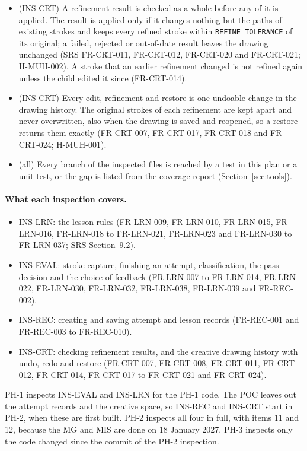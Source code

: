 \documentclass[12pt, titlepage]{article}
\begin{document}
\begin{itemize}
\item[A9] (INS-CRT) A refinement result is checked as a whole before any
of it is applied. The result is applied only if it changes nothing but the paths
of existing strokes and keeps every refined stroke within
\texttt{REFINE\_TOLERANCE} of its original; a failed, rejected or
out-of-date result leaves the drawing unchanged (SRS FR-CRT-011,
FR-CRT-012, FR-CRT-020 and FR-CRT-021; H-MUH-002). A stroke that an earlier
refinement changed is not refined again unless the child edited it since
(FR-CRT-014).
\item[A10] (INS-CRT) Every edit, refinement and restore is one undoable
change in the drawing history. The original strokes of each refinement
are kept apart and never overwritten, also when the drawing is saved and
reopened, so a restore returns them exactly (FR-CRT-007, FR-CRT-017,
FR-CRT-018 and FR-CRT-024; H-MUH-001).
\item[A11] (all) Every branch of the inspected files is reached by a test in
this plan or a unit test, or the gap is listed from the coverage report
(Section~\ref{sec:tools}).
\end{itemize}

\paragraph{What each inspection covers.}
\begin{itemize}
\item INS-LRN: the lesson rules (FR-LRN-009, FR-LRN-010, FR-LRN-015,
FR-LRN-016, FR-LRN-018 to FR-LRN-021, FR-LRN-023 and FR-LRN-030 to
FR-LRN-037; SRS Section~9.2).
\item INS-EVAL: stroke capture, finishing an attempt, classification, the
pass decision and the choice of feedback (FR-LRN-007 to FR-LRN-014,
FR-LRN-022, FR-LRN-030, FR-LRN-032, FR-LRN-038, FR-LRN-039 and FR-REC-002).
\item INS-REC: creating and saving attempt and lesson records (FR-REC-001
and FR-REC-003 to FR-REC-010).
\item INS-CRT: checking refinement results, and the creative drawing
history with undo, redo and restore (FR-CRT-007, FR-CRT-008, FR-CRT-011,
FR-CRT-012, FR-CRT-014, FR-CRT-017 to FR-CRT-021 and FR-CRT-024).
\end{itemize}
PH-1 inspects INS-EVAL and INS-LRN for the PH-1 code. The POC leaves out
the attempt records and the creative space, so INS-REC and INS-CRT start in
PH-2, when these are first built.
PH-2 inspects all four in full, with items 11 and 12, because the MG and
MIS are done on 18 January 2027. PH-3 inspects only the code changed since
the commit of the PH-2 inspection.
\end{document}
